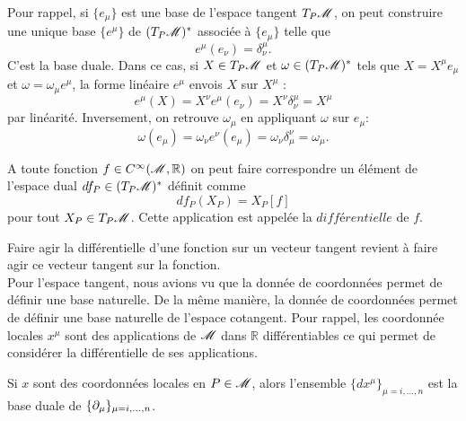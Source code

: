 \documentclass[a4paper,11pt]{report}
\begin{document}
                Pour rappel, si $\{e_\mu\}$ est une base de l'espace tangent $T_P\mathscr{M}$, on peut construire une unique base $\{e^\mu\}$ de $(T_P\mathscr{M})^*$ associée à $\{e_\mu\}$ telle que
                \begin{equation}
                    e^\mu(e_\nu) = \delta^\mu_\nu.
                \end{equation}
                C'est la base duale. Dans ce cas, si $X\in T_P\mathscr{M}$ et $\omega\in (T_P\mathscr{M})^*$ tels que $X = X^\mu e_\mu$ et $\omega = \omega_\mu e^\mu$, la forme linéaire $e^\mu$ envois $X$ sur $X^\mu$ :
                \begin{equation}
                    e^\mu(X) =  X^\nu e^\mu( e_\nu) = X^\nu \delta^\mu_\nu = X^\mu
                \end{equation}
                par linéarité. Inversement, on retrouve $\omega_\mu$ en appliquant $\omega$ sur $e_\mu$:
                \begin{equation}
                    \omega(e_\mu) = \omega_\nu e^\nu(e_\mu) = \omega_\nu \delta^\nu_\mu = \omega_\mu.
                \end{equation}
                
                \begin{definition}
                    A toute fonction $f\in C^\infty(\mathscr{M},\mathbb{R})$ on peut faire correspondre un élément de l'espace dual $df_P\in(T_P\mathscr{M})^*$ définit comme
                    \begin{equation}
                        df_P(X_P) = X_P[f]
                    \end{equation}
                    pour tout $X_P\in T_P\mathscr{M}$. Cette application est appelée la $\textit{différentielle}$ de $f$.
                \end{definition}
                Faire agir la différentielle d'une fonction sur un vecteur tangent revient à faire agir ce vecteur tangent sur la fonction.\\
                
                Pour l'espace tangent, nous avions vu que la donnée de coordonnées permet de définir une base naturelle. De la même manière, la donnée de coordonnées permet de définir une base naturelle de l'espace cotangent. Pour rappel, les coordonnée locales $x^\mu$ sont des applications de $\mathscr{M}$ dans $\mathbb{R}$ différentiables ce qui permet de considérer la différentielle de ses applications.
                
                \begin{prop}\begin{leftbar}
                    Si $x$ sont des coordonnées locales en $P\in\mathscr{M}$, alors l'ensemble $\{dx^\mu\}_{\mu=i,\dots,n}$ est la base duale de $\{\partial_\mu\}_{\mu=i,\dots,n}$.
                \end{leftbar}\end{prop}
                
\end{document}

